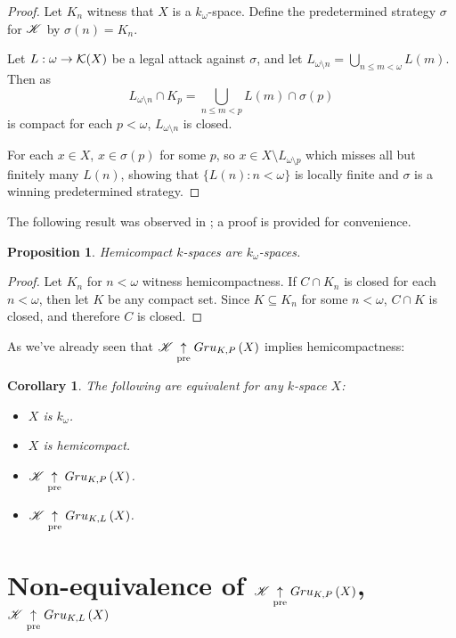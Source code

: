 \documentclass{amsart}
\newtheorem{proposition}[theorem]{Proposition}
\newtheorem{corollary}[theorem]{Corollary}
\theoremstyle{definition}
\begin{document}
\begin{proof}
  Let \(K_n\) witness that \(X\) is a \(k_\omega\)-space. Define the predetermined
  strategy \(\sigma\) for \(\mathscr{K}\) by \(\sigma(n)=K_n\).

  Let \(L:\omega\to\mathcal{K}(X)\) be a legal attack against \(\sigma\), and let
  \(L_{\omega\setminus n} = \bigcup_{n\leq m<\omega}L(m)\). Then as
    \[
      L_{\omega\setminus n}\cap K_p
        =
      \bigcup_{n\leq m< p}L(m) \cap \sigma(p)
    \]
  is compact for each \(p<\omega\), \(L_{\omega\setminus n}\) is closed.

  For each \(x\in X\), \(x\in \sigma(p)\) for some \(p\), so
  \(x\in X\setminus L_{\omega\setminus p}\) which misses all but finitely
  many \(L(n)\), showing that \(\{L(n):n<\omega\}\) is locally finite and
  \(\sigma\) is a winning predetermined strategy.
\end{proof}

The following result was observed in \cite{MR540599}; a proof is provided
for convenience.

\begin{proposition}
  Hemicompact \(k\)-spaces are \(k_\omega\)-spaces.
\end{proposition}

\begin{proof}
  Let \(K_n\) for \(n<\omega\) witness hemicompactness.
  If \(C\cap K_n\) is closed for each \(n<\omega\), then let \(K\) be any compact
  set. Since \(K\subseteq K_n\) for some \(n<\omega\), \(C\cap K\) is closed, and
  therefore \(C\) is closed.
\end{proof}

As we've already seen that \(\mathscr{K} \underset{\text{pre}}{\uparrow} Gru_{K,P}\left({X}\right)\) implies
hemicompactness:

\begin{corollary}
  The following are equivalent for any \(k\)-space \(X\):
    \begin{itemize}
      \item \(X\) is \(k_{\omega}\).
      \item \(X\) is hemicompact.
      \item \(\mathscr{K} \underset{\text{pre}}{\uparrow} Gru_{K,P}\left({X}\right)\).
      \item \(\mathscr{K} \underset{\text{pre}}{\uparrow} Gru_{K,L}\left({X}\right)\).
    \end{itemize}
\end{corollary}

\section{
Non-equivalence of \(\mathscr{K}\underset{\text{pre}}{\uparrow}Gru_{K,P}\left({X}\right)\), \(\mathscr{K}\underset{\text{pre}}{\uparrow}Gru_{K,L}\left({X}\right)\)
}
\end{document}
